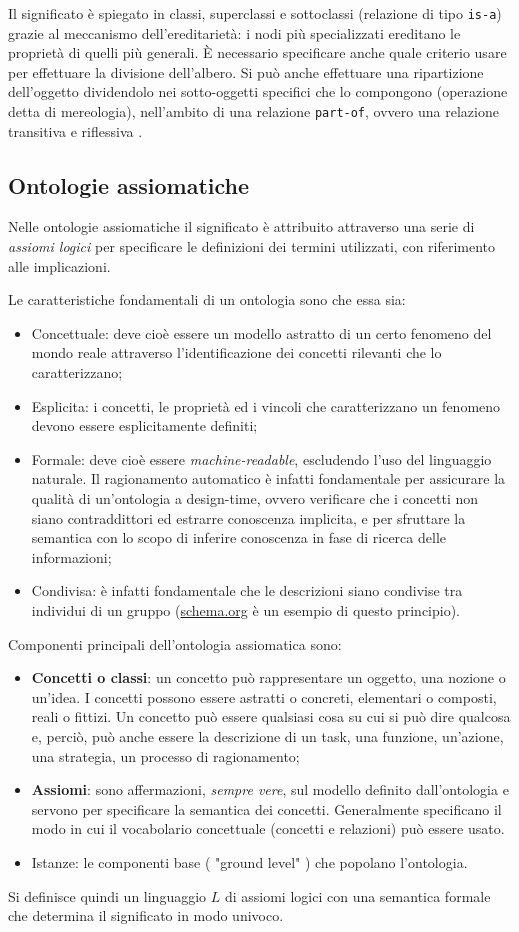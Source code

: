\documentclass[11pt]{article}
\begin{document}
Il significato è spiegato in classi, superclassi e sottoclassi (relazione di tipo \verb|is-a|) grazie al meccanismo dell'ereditarietà: i nodi più specializzati ereditano le proprietà di quelli più generali.
È necessario specificare anche quale criterio usare per effettuare la divisione dell'albero.
Si può anche effettuare una ripartizione dell'oggetto dividendolo nei sotto-oggetti specifici che lo compongono (operazione detta di mereologia), nell'ambito di una relazione \verb|part-of|, ovvero una relazione transitiva e riflessiva .

\subsection{Ontologie assiomatiche}
Nelle ontologie assiomatiche il significato è attribuito attraverso una serie di \textit{assiomi logici} per specificare le definizioni dei termini utilizzati, con riferimento alle implicazioni. 

Le caratteristiche fondamentali di un ontologia sono che essa sia:
\begin{itemize}
\item Concettuale: deve cioè essere un modello astratto di un certo fenomeno del mondo reale attraverso l'identificazione dei concetti rilevanti che lo caratterizzano;
\item Esplicita: i concetti, le proprietà ed i vincoli che caratterizzano un fenomeno devono essere esplicitamente definiti;
\item Formale: deve cioè essere \textit{machine-readable}, escludendo l'uso del linguaggio naturale. Il ragionamento automatico è infatti fondamentale per assicurare la qualità di un'ontologia a design-time, ovvero verificare che i concetti non siano contraddittori ed estrarre conoscenza implicita, e per sfruttare la semantica con lo scopo di inferire conoscenza in fase di ricerca delle informazioni;
\item Condivisa: è infatti fondamentale che le descrizioni siano condivise tra individui di un gruppo (\url{schema.org} è un esempio di questo principio).
\end{itemize}
Componenti principali dell'ontologia assiomatica sono:
\begin{itemize}
\item \textbf{Concetti o classi}: un concetto può rappresentare un oggetto, una nozione o un'idea. I concetti possono essere astratti o concreti, elementari o composti, reali o fittizi. Un concetto può essere qualsiasi cosa su cui si può dire qualcosa e, perciò, può anche essere la descrizione di un task, una funzione, un'azione, una strategia, un processo di ragionamento;
\item \textbf{Assiomi}: sono affermazioni, \textit{sempre vere}, sul modello definito dall'ontologia e servono per specificare la semantica dei concetti. Generalmente specificano il modo in cui il vocabolario concettuale (concetti e relazioni) può essere usato.
\item Istanze: le componenti base ( "ground level" ) che popolano l'ontologia.
\end{itemize}
Si definisce quindi un linguaggio $L$ di assiomi logici con una semantica formale che determina il significato in modo univoco.
\end{document}
